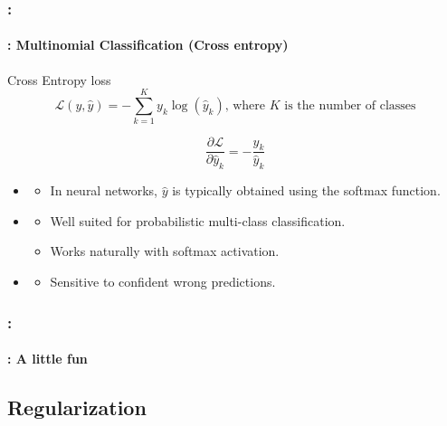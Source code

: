 \documentclass[xcolor=table]{beamer}
\begin{document}
\begin{frame}
	\frametitle{\insertshortsubtitle: \insertsection}
	\framesubtitle{\insertsubsection: Multinomial Classification (Cross entropy)}

	\begin{block}{Cross Entropy loss}
		\[\mathcal{L}(y, \hat{y}) = - \sum\limits_{k=1}^{K} y_{k} \log(\hat{y}_{k}) \text{, where } K \text{ is the number of classes} \]
		
		\[
		\frac{\partial \mathcal{L}}{\partial \hat{y}_k} = - \frac{y_{k}}{\hat{y}_{k}}
		\]
	\end{block}
	
	\begin{itemize}
		\item {}
		\begin{itemize}
			\item In neural networks, $\hat{y}$ is typically obtained using the softmax function.
		\end{itemize}
		
		\item {}
		\begin{itemize}
			\item Well suited for probabilistic multi-class classification.
			\item Works naturally with softmax activation.
		\end{itemize}
		
		\item {}
		\begin{itemize}
			\item Sensitive to confident wrong predictions.
		\end{itemize}
	\end{itemize}

\end{frame}

\begin{frame}
	\frametitle{\insertshortsubtitle: \insertsection}
	\framesubtitle{\insertsubsection: A little fun}
	
	
\end{frame}

\subsection{Regularization}
\end{document}
